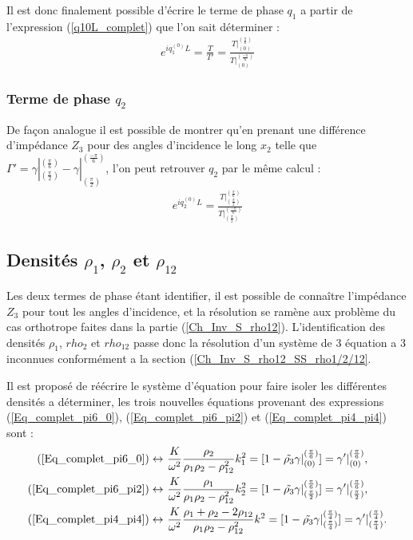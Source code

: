 \documentclass[12pt]{report}
\begin{document}
    Il est donc finalement possible d'écrire le terme de phase $q_1$ a partir de l'expression (\ref{q10L_complet}) que l'on sait déterminer :
    \begin{align}
    e^{iq_1^{(0)}L}=\frac{T}{T'}=\frac{T|^{(\frac{\pi}{6})}_{(0)}}{T|^{(\frac{-\pi}{6})}_{(0)}} \label{q10L_complet}
    \end{align}

\subsubsection*{Terme de phase $q_2$}
	De façon analogue il est possible de montrer qu'en prenant une différence d'impédance $Z_3$ pour des angles d'incidence le long $x_2$ telle que $\Gamma'=\gamma|^{(\frac{\pi}{6})}_{(\frac{\pi}{2})}-\gamma|^{(\frac{-\pi}{6})}_{(\frac{\pi}{2})}$, l'on peut retrouver $q_2$ par le même calcul :
    \begin{align}
    e^{iq_2^{(0)}L}=\frac{T|^{(\frac{\pi}{6})}_{(\frac{\pi}{2})}}{T|^{(\frac{-\pi}{6})}_{(\frac{\pi}{2})}} \label{q20L_complet}
    \end{align}
        

\subsection{Densités $\rho_1$, $\rho_2$ et $\rho_{12}$}
	Les deux termes de phase étant identifier, il est possible de connaître l'impédance $Z_3$ pour tout les angles d'incidence, et la résolution se ramène aux problème du cas orthotrope faites dans la partie (\ref{Ch_Inv_S_rho12}).
    L'identification des densités $\rho_1$, $rho_2$ et $rho_{12}$ passe donc la résolution d'un système de 3 équation a 3 inconnues conformément a la section (\ref{Ch_Inv_S_rho12_SS_rho1/2/12}.
    
    Il est proposé de réécrire le système d'équation pour faire isoler les différentes densités a déterminer, les trois nouvelles équations provenant des expressions (\ref{Eq_complet_pi6_0}), (\ref{Eq_complet_pi6_pi2}) et (\ref{Eq_complet_pi4_pi4}) sont :
    \begin{align}
    (\ref{Eq_complet_pi6_0}) \leftrightarrow\ &\frac{K}{\omega^2}\frac{\rho_2}{\rho_1\rho_2-\rho_{12}^2}k_1^2=[1-\tilde{\rho_3}\gamma|^{(\frac{\pi}{6})}_{(0)}]=\gamma'|^{(\frac{\pi}{6})}_{(0)}\label{Comp_1},\\
    (\ref{Eq_complet_pi6_pi2}) \leftrightarrow\ &\frac{K}{\omega^2}\frac{\rho_1}{\rho_1\rho_2-\rho_{12}^2}k_2^2=[1-\tilde{\rho_3}\gamma|^{(\frac{\pi}{6})}_{(\frac{\pi}{2})}]=\gamma'|^{(\frac{\pi}{6})}_{(\frac{\pi}{2})}\label{Comp_2},\\
    (\ref{Eq_complet_pi4_pi4}) \leftrightarrow\ &\frac{K}{\omega^2}\frac{\rho_1+\rho_2-2\rho_{12}}{\rho_1\rho_2-\rho_{12}^2}k^2=[1-\tilde{\rho_3}\gamma|^{(\frac{\pi}{4})}_{(\frac{\pi}{4})}]=\gamma'|^{(\frac{\pi}{4})}_{(\frac{\pi}{4})}\label{Comp_3}.
    \end{align}
    
\end{document}
